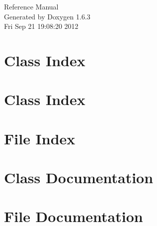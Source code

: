 \documentclass[a4paper]{book}
\begin{document}
\hypersetup{pageanchor=false}
\begin{titlepage}
\vspace*{7cm}
\begin{center}
{\Large Reference Manual}\\
\vspace*{1cm}
{\large Generated by Doxygen 1.6.3}\\
\vspace*{0.5cm}
{\small Fri Sep 21 19:08:20 2012}\\
\end{center}
\end{titlepage}
\clearemptydoublepage
{}
\tableofcontents
\clearemptydoublepage
{}
\hypersetup{pageanchor=true}
\chapter{Class Index}

\chapter{Class Index}

\chapter{File Index}

\chapter{Class Documentation}















\chapter{File Documentation}

















\printindex
\end{document}
